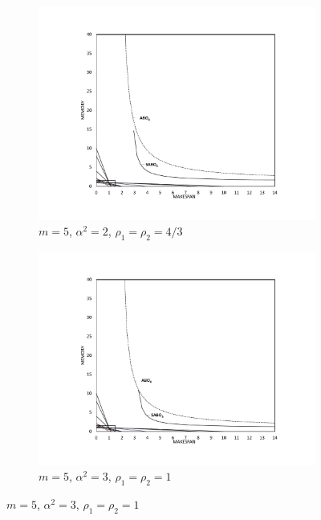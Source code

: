 \documentclass[twocolumn]{svjour3}
\begin{document}
     
\begin{figure}
  \centering
  \begin{subfigure}[b]{0.5\textwidth}
    \includegraphics[width=\textwidth]{m5alpha2rho133.pdf}
    \caption{$m=5$, $\alpha^2=2$, $\rho_1=\rho_2=4/3$}
    \label{fig:ch5-3.1}
  \end {subfigure} %
  
  \begin{subfigure}[b]{0.5\textwidth}
    \includegraphics[width=\textwidth]{m5alpha3rho1.pdf}
    \caption{$m=5$, $\alpha^2=3$, $\rho_1=\rho_2=1$}
    \label{fig:ch5-3.2}
  \end {subfigure} %
  

\end{figure}
\end{document}

